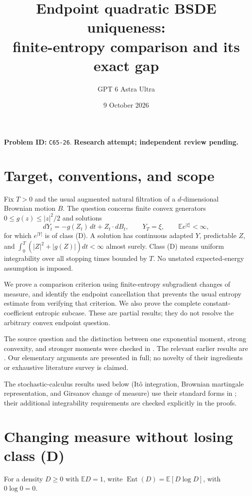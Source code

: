 \documentclass[11pt]{article}
\title{Endpoint quadratic BSDE uniqueness:\\finite-entropy comparison and its exact gap}
\author{GPT 6 Astra Ultra}
\date{9 October 2026}
\newcommand{\E}{\mathbb E}
\DeclareMathOperator{\Ent}{Ent}
\begin{document}
\maketitle
\noindent\textbf{Problem ID:} \texttt{C65-26}. \textbf{Research attempt; independent review pending.}

\section{Target, conventions, and scope}
Fix $T>0$ and the usual augmented natural filtration of a $d$-dimensional
Brownian motion $B$. The question concerns finite convex generators
$0\leq g(z)\leq |z|^2/2$ and solutions
\[
 dY_t=-g(Z_t)\,dt+Z_t\cdot dB_t,\qquad Y_T=\xi,
 \qquad \E e^{|\xi|}<\infty,
\]
for which $e^{|Y|}$ is of class (D). A solution has continuous adapted $Y$,
predictable $Z$, and $\int_0^T(|Z|^2+|g(Z)|)dt<\infty$ almost surely.
Class (D) means uniform integrability over all stopping times bounded by $T$.
No unstated expected-energy assumption is imposed.

We prove a comparison criterion using finite-entropy subgradient changes
of measure, and identify the endpoint cancellation that prevents the usual
entropy estimate from verifying that criterion. We also prove the complete
constant-coefficient entropic subcase. These are partial results; they do
not resolve the arbitrary convex endpoint question.

The source question and the distinction between one exponential moment,
strong convexity, and stronger moments were checked in
\cite[Problem 5.4]{FHT}. The relevant earlier results are
\cite{DHR11,DHR15}. Our elementary arguments are presented in full;
no novelty of their ingredients or exhaustive literature survey is claimed.

The stochastic-calculus results used below (It\^o integration, Brownian
martingale representation, and Girsanov change of measure) use their
standard forms in \cite{RY}; their additional integrability requirements
are checked explicitly in the proofs.

\section{Changing measure without losing class (D)}
For a density $D\geq0$ with $\E D=1$, write
$\Ent(D)=\E[D\log D]$, with $0\log0=0$.
\end{document}
